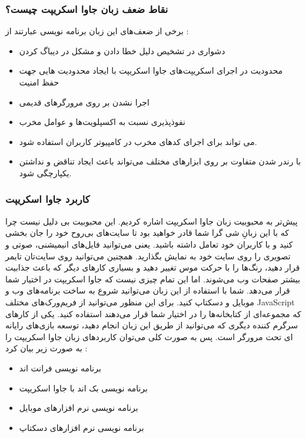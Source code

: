 \subsubsection{نقاط ضعف زبان جاوا اسکریپت چیست؟}
 برخی از ضعف‌های این زبان برنامه نویسی عبارتند از :
\begin{itemize}
	\item
دشواری در تشخیص دلیل خطا دادن و مشکل در دیباگ کردن
	\item
محدودیت در اجرای اسکریپت‌های جاوا اسکریپت با ایجاد محدودیت هایی جهت حفظ امنیت
	\item
اجرا نشدن بر روی مرورگرهای قدیمی
	\item
نفوذپذیری نسبت به اکسپلویت‌ها و عوامل مخرب
	\item
می تواند برای اجرای کدهای مخرب در کامپیوتر کاربران استفاده شود.
	\item
با رندر شدن متفاوت بر روی ابزارهای مختلف می‌تواند باعث ایجاد تناقض و نداشتن یکپارچگی شود.
\end{itemize}

\subsubsection{کاربرد جاوا اسکریپت}
پیش‌تر به محبوبیت زبان جاوا اسکریپت اشاره کردیم. این محبوبیت بی دلیل نیست چرا که با این زبانِ شی گرا شما قادر خواهید بود تا سایت‌های بی‌روح خود را جان بخشی کنید و با کاربران خود تعامل داشته باشید. یعنی می‌توانید فایل‌های انیمیشنی، صوتی و تصویری را روی سایت خود به نمایش بگذارید. همچنین می‌توانید روی سایت‌تان تایمر قرار دهید، رنگ‌ها را با حرکت موس تغییر دهید و بسیاری کارهای دیگر که باعث جذابیت بیشتر صفحات وب می‌شوند.
اما این تمام چیزی نیست که جاوا اسکریپت در اختیار شما قرار می‌دهد. شما با استفاده از این زبان می‌توانید شروع به ساخت برنامه‌های وب و موبایل و دسکتاپ کنید. برای این منظور می‌توانید از فریم‌ورک‌های مختلف JavaScript که مجموعه‌ای از کتابخانه‌ها را در اختیار شما قرار می‌دهند استفاده کنید. یکی از کارهای سرگرم کننده دیگری که می‌توانید از طریق این زبان انجام دهید، توسعه بازی‌های رایانه ای تحت مرورگر است.  پس به صورت کلی می‌توان کاربردهای زبان جاوا اسکریپت را به صورت زیر بیان کرد :
\begin{itemize}
	\item
برنامه نویسی فرانت اند
	\item
برنامه نویسی بک اند با جاوا اسکریپت
	\item
برنامه نویسی نرم افزارهای موبایل
	\item
برنامه نویسی نرم افزارهای دسکتاپ

\end{itemize}

